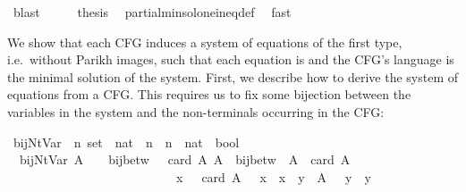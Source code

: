 \begin{isabellebody}
\ blast\isanewline
\ \ \isamarkupfalse%
\ \isamarkupfalse%
\ {\isacharquery}{\kern0pt}thesis\ \isamarkupfalse%
\ partial{\isacharunderscore}{\kern0pt}min{\isacharunderscore}{\kern0pt}sol{\isacharunderscore}{\kern0pt}one{\isacharunderscore}{\kern0pt}ineq{\isacharunderscore}{\kern0pt}def\ \isamarkupfalse%
\ fast\isanewline
{}\isamarkupfalse%
%
\endisatagproof
{\isafoldproof}%
%
\isadelimproof
%
\endisadelimproof
%
\isadelimdocument
%
\endisadelimdocument
%
\isatagdocument
%
\isamarkuptrue%
%
\endisatagdocument
{\isafolddocument}%
%
\isadelimdocument
%
\endisadelimdocument
%
\begin{isamarkuptext}%
We show that each CFG induces a system of equations of the first type, i.e.\ without Parikh images,
such that each equation is  and the CFG's language is the minimal solution of the system.
First, we describe how to derive the system of equations from a CFG. This requires us to fix some
bijection between the variables in the system and the non-terminals occurring in the CFG:%
\end{isamarkuptext}\isamarkuptrue%
\isamarkupfalse%
\ bij{\isacharunderscore}{\kern0pt}Nt{\isacharunderscore}{\kern0pt}Var\ {\isacharcolon}{\kern0pt}{\isacharcolon}{\kern0pt}\ {\isachardoublequoteopen}{\isacharprime}{\kern0pt}n\ set\ {\isasymRightarrow}\ {\isacharparenleft}{\kern0pt}nat\ {\isasymRightarrow}\ {\isacharprime}{\kern0pt}n{\isacharparenright}{\kern0pt}\ {\isasymRightarrow}\ {\isacharparenleft}{\kern0pt}{\isacharprime}{\kern0pt}n\ {\isasymRightarrow}\ nat{\isacharparenright}{\kern0pt}\ {\isasymRightarrow}\ bool{\isachardoublequoteclose}\ \isanewline
\ \ {\isachardoublequoteopen}bij{\isacharunderscore}{\kern0pt}Nt{\isacharunderscore}{\kern0pt}Var\ A\ {\isasymgamma}\ {\isasymgamma}{\isacharprime}{\kern0pt}\ {\isasymequiv}\ bij{\isacharunderscore}{\kern0pt}betw\ {\isasymgamma}\ {\isacharbraceleft}{\kern0pt}{\isachardot}{\kern0pt}{\isachardot}{\kern0pt}{\isacharless}{\kern0pt}\ card\ A{\isacharbraceright}{\kern0pt}\ A\ {\isasymand}\ bij{\isacharunderscore}{\kern0pt}betw\ {\isasymgamma}{\isacharprime}{\kern0pt}\ A\ {\isacharbraceleft}{\kern0pt}{\isachardot}{\kern0pt}{\isachardot}{\kern0pt}{\isacharless}{\kern0pt}\ card\ A{\isacharbraceright}{\kern0pt}\isanewline
\ \ \ \ \ \ \ \ \ \ \ \ \ \ \ \ \ \ \ \ \ \ \ \ \ \ {\isasymand}\ {\isacharparenleft}{\kern0pt}{\isasymforall}x\ {\isasymin}\ {\isacharbraceleft}{\kern0pt}{\isachardot}{\kern0pt}{\isachardot}{\kern0pt}{\isacharless}{\kern0pt}\ card\ A{\isacharbraceright}{\kern0pt}{\isachardot}{\kern0pt}\ {\isasymgamma}{\isacharprime}{\kern0pt}\ {\isacharparenleft}{\kern0pt}{\isasymgamma}\ x{\isacharparenright}{\kern0pt}\ {\isacharequal}{\kern0pt}\ x{\isacharparenright}{\kern0pt}\ {\isasymand}\ {\isacharparenleft}{\kern0pt}{\isasymforall}y\ {\isasymin}\ A{\isachardot}{\kern0pt}\ {\isasymgamma}\ {\isacharparenleft}{\kern0pt}{\isasymgamma}{\isacharprime}{\kern0pt}\ y{\isacharparenright}{\kern0pt}\ {\isacharequal}{\kern0pt}\ y{\isacharparenright}{\kern0pt}{\isachardoublequoteclose}\isanewline

\end{isabellebody}

